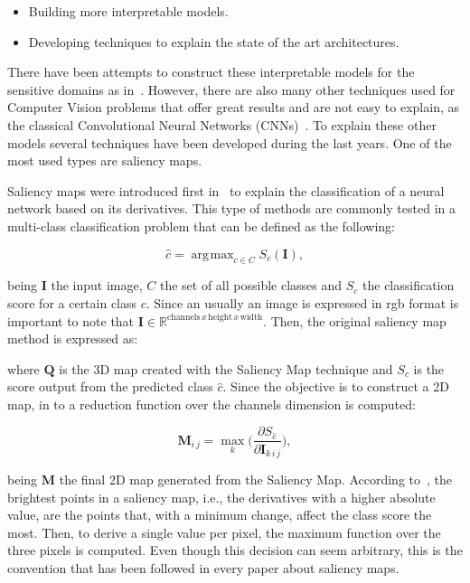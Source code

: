 \documentclass[preprint,12pt]{elsarticle}
\DeclareMathOperator*{\argmax}{arg\!max}
\begin{document}
\begin{itemize}
    \item Building more interpretable models.
    \item Developing techniques to explain the state of the art architectures.
\end{itemize}

There have been attempts to construct these interpretable models for the sensitive domains as in~\cite{Singh2022}. However, there are also many other techniques used for Computer Vision problems that offer great results and are not easy to explain, as the classical Convolutional Neural Networks (CNNs)~\cite{LeCun1998}. To explain these other models  several techniques have been developed during the last years. One of the most used types are saliency maps.

Saliency maps were introduced first in~\cite{Simonyan2014} to explain the classification of a neural network based on its derivatives. This type of methods are commonly tested in a multi-class classification problem that can be defined as the following:

\begin{equation}
    \label{eq: cnn output}
    \hat{c} = \argmax_{c \in C}S_c(\boldsymbol{I}),
\end{equation}

\noindent
being $\boldsymbol{I}$ the input image, $C$ the set of all possible classes and $S_c$ the classification score for a certain class $c$. Since an usually an image is expressed in rgb format is important to note that $\boldsymbol{I} \in \mathbb{R}^{\text{channels}\, x\, \text{height}\, x\, \text{width}}$. Then, the original saliency map method is expressed as:

\noindent
where $\boldsymbol{Q}$ is the 3D map created with the Saliency Map technique and $S_{\hat{c}}$ is the score output from the predicted class $\hat{c}$. Since the objective is to construct a 2D map, in \cite{Simonyan2014} to a reduction function over the channels dimension is computed:

\begin{equation}
    \label{eq: 3d saliency map}
    \boldsymbol{M}_{i\, j} = \max_{k} \bigg ( \frac{\partial S_{\hat{c}}}{\partial \boldsymbol{I}_{k\, i\, j}} \bigg ),
\end{equation}

being $\boldsymbol{M}$ the final 2D map generated from the Saliency Map. According to~\cite{Simonyan2014}, the brightest points in a saliency map, i.e., the derivatives with a higher absolute value, are the points that, with a minimum change, affect the class score the most. Then, to derive a single value per pixel, the maximum function over the three pixels is computed. Even though this decision can seem arbitrary, this is the convention that has been followed in every paper about saliency maps.
\end{document}
